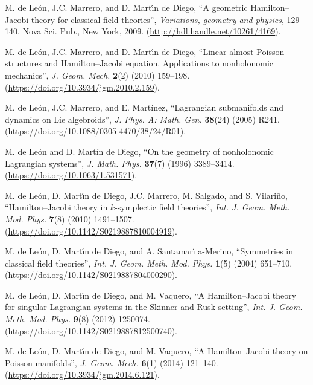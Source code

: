 \documentclass[12pt]{report}
\begin{document}
\begin{thebibliography}{999}
M. de Le\'on, J.C. Marrero, and D. Mart\'\i n de Diego,
 ``A geometric Hamilton--Jacobi theory for classical field theories'',
{\sl Variations, geometry and physics}, 129--140, 
Nova Sci. Pub.,  New York, 2009.
\newblock (\url{http://hdl.handle.net/10261/4169}).

M. de Le\'on, J.C. Marrero, and D. Mart\'\i n de Diego, 
``Linear almost Poisson structures and Hamilton--Jacobi equation.
Applications to nonholonomic mechanics'', 
{\sl J. Geom. Mech.} {\bf 2}(2) (2010) 159--198.
(\url{https://doi.org/10.3934/jgm.2010.2.159}).

M. de Le\'on, J.C. Marrero, and E. Mart\'inez,
``Lagrangian submanifolds and dynamics on Lie algebroids'',
{\sl J. Phys. A: Math. Gen.} {\bf 38}(24) (2005) R241.
(\url{https://doi.org/10.1088/0305-4470/38/24/R01}).


M. de Le\'on and D. Mart\'in de Diego, 
``On the geometry of nonholonomic Lagrangian systems'',
{\sl J. Math. Phys.} {\bf 37}(7) (1996)  3389--3414.
(\url{https://doi.org/10.1063/1.531571}).

 M. de Le\'on, D. Mart\'\i n de Diego, J.C. Marrero, M. Salgado, and S. Vilari\~{n}o,
``Hamilton--Jacobi theory in $k$-symplectic field theories'',
 {\sl Int. J. Geom. Meth. Mod. Phys.} {\bf 7}(8) (2010) 1491--1507.
(\url{https://doi.org/10.1142/S0219887810004919}).

{\rm M. de Le\'on, D. Mart\'\i n de Diego, and A. Santamar\'\i
a-Merino}, 
``Symmetries in classical field theories'', 
{\sl Int. J. Geom. Meth. Mod. Phys.} {\bf 1}(5) (2004) 651--710.
(\url{https://doi.org/10.1142/S0219887804000290}).

M. de Le\'on, D. Mart\'\i n de Diego, and M. Vaquero,
``A Hamilton--Jacobi theory for singular Lagrangian systems in the Skinner and Rusk setting'',
{\sl Int. J. Geom. Meth. Mod. Phys.} {\bf 9}(8) (2012) 1250074. %
(\url{https://doi.org/10.1142/S0219887812500740}).

{\rm M. de Le\'on, D. Mart\'\i n de Diego, and M. Vaquero},
``A Hamilton--Jacobi theory on Poisson manifolds'',
{\sl J. Geom. Mech.} {\bf 6}(1) (2014) 121--140.
(\url{https://doi.org/10.3934/jgm.2014.6.121}).


\end{thebibliography}
\end{document}
